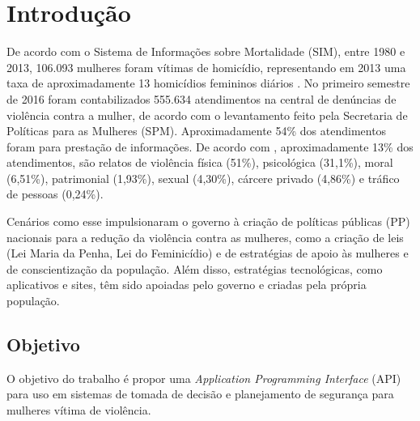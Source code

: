 \chapter[Introdução]{Introdução}

De acordo com o Sistema de Informações sobre Mortalidade (SIM), entre 1980 e 2013, 106.093 mulheres foram vítimas de homicídio, representando em 2013 uma taxa de aproximadamente 13 homicídios femininos
diários \cite{mapa_violencia_2015}. 
No primeiro semestre de 2016 foram contabilizados 555.634 atendimentos na central de denúncias 
de violência contra a mulher, de acordo com o levantamento feito pela Secretaria de Políticas para as Mulheres (SPM). 
Aproximadamente 54\% dos atendimentos foram para prestação de informações. De acordo com \cite{portal_180}, aproximadamente 13\% dos atendimentos, são relatos de violência física (51\%), psicológica (31,1\%), moral (6,51\%), patrimonial (1,93\%), sexual (4,30\%), cárcere privado (4,86\%) e tráfico de pessoas (0,24\%).

Cenários como esse impulsionaram o governo à criação de políticas públicas (PP) 
nacionais para a redução da violência contra as mulheres, como a criação de leis (Lei Maria da Penha, Lei do Feminicídio)
e de estratégias de apoio às mulheres e de conscientização da população. Além disso, estratégias tecnológicas, como aplicativos e sites, têm sido apoiadas pelo governo e criadas pela própria população. 


\section{Objetivo}
O objetivo do trabalho é propor uma \textit{Application Programming Interface} (API) para uso em sistemas de tomada de decisão e planejamento de segurança para mulheres vítima de violência. 






